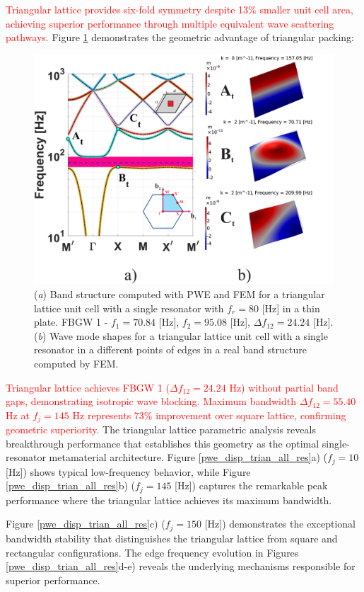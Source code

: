 \documentclass[review,numbers,sort&compress]{elsarticle}
\begin{document}
\textcolor{red}{Triangular lattice provides six-fold symmetry despite 13\% smaller unit cell area, achieving superior performance through multiple equivalent wave scattering pathways.} Figure \ref{pwe_fem_disp_modal_trian} demonstrates the geometric advantage of triangular packing:

\begin{figure}[htb]
	\centering
	\includegraphics[width=.8\textwidth]{1_3_disp_frf_trian.pdf}
	\caption{(\textit{a}) Band structure computed with PWE and FEM for a triangular lattice unit cell with a single resonator with $f_r = 80$ [Hz] in a thin plate. FBGW 1 - $f_1 = 70.84$ [Hz], $f_2 = 95.08$ [Hz], $\Delta f_{12} = 24.24 $ [Hz]. (\textit{b}) Wave mode shapes for a triangular lattice unit cell with a single resonator in a different points of edges in a real band structure computed by FEM.}
	\label{pwe_fem_disp_modal_trian}
\end{figure}

\textcolor{red}{Triangular lattice achieves FBGW 1 ($\Delta f_{12} = 24.24$ Hz) without partial band gaps, demonstrating isotropic wave blocking. Maximum bandwidth $\Delta f_{12} = 55.40$ Hz at $f_j = 145$ Hz represents 73\% improvement over square lattice, confirming geometric superiority.} The triangular lattice parametric analysis reveals breakthrough performance that establishes this geometry as the optimal single-resonator metamaterial architecture. Figure \ref{pwe_disp_trian_all_res}a) ($f_j = 10$ [Hz]) shows typical low-frequency behavior, while Figure \ref{pwe_disp_trian_all_res}b) ($f_j = 145$ [Hz]) captures the remarkable peak performance where the triangular lattice achieves its maximum bandwidth.

\newpage
Figure \ref{pwe_disp_trian_all_res}c) ($f_j = 150$ [Hz]) demonstrates the exceptional bandwidth stability that distinguishes the triangular lattice from square and rectangular configurations. The edge frequency evolution in Figures \ref{pwe_disp_trian_all_res}d-e) reveals the underlying mechanisms responsible for superior performance.
\end{document}
